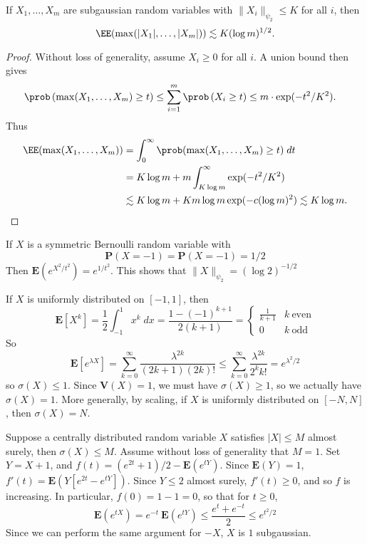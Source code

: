 \begin{theorem}
    If $X_1, \dots, X_m$ are subgaussian random variables with $\| X_i \|_{\psi_2} \leq K$ for all $i$, then
    \[ \EE(\max(|X_1|,\dots,|X_m|)) \lesssim K (\log m)^{1/2}. \]
\end{theorem}
\begin{proof}
    Without loss of generality, assume $X_i \geq 0$ for all $i$. A union bound then gives
    \begin{align*}
        \prob \left( \max(X_1, \dots, X_m) \geq t \right) &\leq \sum_{i = 1}^m \prob \left( X_i \geq t \right) \leq m \cdot \exp(-t^2/K^2).
    \end{align*}
    Thus
    \begin{align*}
        \EE(\max(X_1, \dots, X_m)) &= \int_0^\infty \prob(\max(X_1, \dots, X_m) \geq t )\; dt\\
        &= K \log m + m \int_{K \log m}^\infty \exp(-t^2/K^2)\\
        &\lesssim K \log m + Km \log m \exp(-c (\log m)^2) \lesssim K \log m. \qedhere
    \end{align*}
\end{proof}

\begin{example}
    If $X$ is a symmetric Bernoulli random variable with
    \[ \mathbf{P}(X = -1) = \mathbf{P}(X = -1) = 1/2 \]
    Then $\mathbf{E}(e^{X^2/t^2}) = e^{1/t^2}$. This shows that $\| X \|_{\psi_2} = (\log 2)^{-1/2}$
\end{example}

\begin{example}
    If $X$ is uniformly distributed on $[-1,1]$, then
    \[ \mathbf{E}[X^k] = \frac{1}{2} \int_{-1}^1 x^k\; dx = \frac{1 - (-1)^{k+1}}{2(k+1)} = \begin{cases} \frac{1}{k+1} & k\ \text{even} \\ 0 & k\ \text{odd} \end{cases} \]
    So
    \[ \mathbf{E}[e^{\lambda X}] = \sum_{k = 0}^\infty \frac{\lambda^{2k}}{(2k+1)(2k)!} \leq \sum_{k = 0}^\infty \frac{\lambda^{2k}}{2^k k!} = e^{\lambda^2/2} \]
    so $\sigma(X) \leq 1$. Since $\mathbf{V}(X) = 1$, we must have $\sigma(X) \geq 1$, so we actually have $\sigma(X) = 1$. More generally, by scaling, if $X$ is uniformly distributed on $[-N,N]$, then $\sigma(X) = N$.
\end{example}

\begin{example}
    Suppose a centrally distributed random variable $X$ satisfies $|X| \leq M$ almost surely, then $\sigma(X) \leq M$. Assume without loss of generality that $M = 1$. Set $Y = X+1$, and $f(t) = (e^{2t} + 1)/2 - \mathbf{E}(e^{tY})$. Since $\mathbf{E}(Y) = 1$, $f'(t) = \mathbf{E}(Y[e^{2t} - e^{tY}])$. Since $Y \leq 2$ almost surely, $f'(t) \geq 0$, and so $f$ is increasing. In particular, $f(0) = 1 - 1 = 0$, so that for $t \geq 0$,
    \[ \mathbf{E}(e^{tX}) = e^{-t}\ \mathbf{E}(e^{tY}) \leq \frac{e^{t} + e^{-t}}{2} \leq e^{t^2/2} \]
    Since we can perform the same argument for $-X$, $X$ is $1$ subgaussian.
\end{example}

